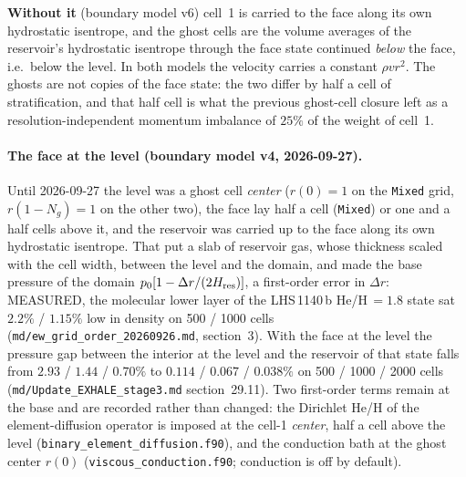 \documentclass[english,a4paper]{my_memo}
\begin{document}
\textbf{Without it} (boundary model v6) cell~1 is carried to the face along
its own hydrostatic isentrope, and the ghost cells are the volume averages of
the reservoir's hydrostatic isentrope through the face state continued
\emph{below} the face, i.e.\ below the level. In both models the velocity
carries a constant $\rho v r^2$. The ghosts are not copies of the face state:
the two differ by half a cell of stratification, and that half cell is what
the previous ghost-cell closure left as a resolution-independent momentum
imbalance of $25\%$ of the weight of cell~1.

\paragraph{The face at the level (boundary model v4, 2026-09-27).} Until
2026-09-27 the level was a ghost cell \emph{center} ($r(0)=1$ on the
\texttt{Mixed} grid, $r(1-N_g)=1$ on the other two), the face lay half a cell
(\texttt{Mixed}) or one and a half cells above it, and the reservoir was
carried up to the face along its own hydrostatic isentrope. That put a slab of
reservoir gas, whose thickness scaled with the cell width, between the level
and the domain, and made the base pressure of the domain
$p_0[1-\Delta r/(2H_{\rm res})]$, a first-order error in $\Delta r$: MEASURED,
the molecular lower layer of the LHS\,1140\,b He/H\,$=1.8$ state sat
$2.2\%$ / $1.15\%$ low in density on 500 / 1000 cells
(\texttt{md/ew\_grid\_order\_20260926.md}, section~3). With the face at the
level the pressure gap between the interior at the level and the reservoir of
that state falls from $2.93$ / $1.44$ / $0.70\%$ to $0.114$ / $0.067$ /
$0.038\%$ on 500 / 1000 / 2000 cells (\texttt{md/Update\_EXHALE\_stage3.md}
section~29.11). Two first-order terms remain at the base and are recorded
rather than changed: the Dirichlet He/H of the element-diffusion operator is
imposed at the cell-1 \emph{center}, half a cell above the level
(\texttt{binary\_element\_diffusion.f90}), and the conduction bath at the
ghost center $r(0)$ (\texttt{viscous\_conduction.f90}; conduction is off by
default).
\end{document}
